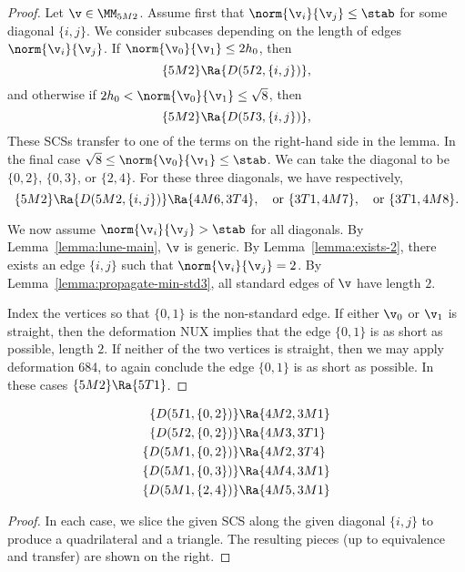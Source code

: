 \begin{proof}
Let $\v\in\MM_{5M2}$.  
Assume first that $\norm{\v_i}{\v_j}\le \stab$ for some diagonal $\{i,j\}$.
We consider subcases depending on the length of edges $\norm{\v_i}{\v_j}$.
If $\norm{\v_0}{\v_1}\le 2h_0$, then 
\[
\{5M2\}\Ra \{D(5I2,\{i,j\})\},
\]
and otherwise if  $2h_0 < \norm{\v_0}{\v_1} \le \sqrt8$, then
\[
\{5M2\}\Ra \{D(5I3,\{i,j\})\},
\]
These SCSs transfer to one of the terms on the right-hand side in the lemma.
In the final case $\sqrt8\le \norm{\v_0}{\v_1}\le \stab$.  We can take the diagonal to be $\{0,2\}$, $\{0,3\}$,
or $\{2,4\}$.  For these three diagonals, we have respectively,
\[
\{5M2\}\Ra \{D(5M2,\{i,j\})\}\Ra \{4M6,3T4\},\quad \text{or~} \{3T1,4M7\},\quad \text{or~} \{3T1,4M8\}.
\]

We now assume $\norm{\v_i}{\v_j}>\stab$ for all diagonals.
By Lemma~\ref{lemma:lune-main}, $\v$ is generic.
By Lemma~\ref{lemma:exists-2}, there exists an edge $\{i,j\}$ such that $\norm{\v_i}{\v_j} = 2$.
By Lemma~\ref{lemma:propagate-min-std3}, all standard edges of $\v$ have length $2$.

Index the vertices so that $\{0,1\}$ is the non-standard edge.  If either $\v_0$ or $\v_1$ is straight, then
the deformation NUX implies that the edge $\{0,1\}$ is as short as possible, length $2$.  
If neither of the two vertices is straight, then we may apply deformation 684, to again conclude the edge $\{0,1\}$
is as short as possible.
%
In these cases
$\{5M2\}\Ra\{5T1\}$.
\end{proof}

\begin{lemma}[]
\begin{align*}
\{D(5I1,\{0,2\})\}&\Ra \{4M2,3M1\}\\
\{D(5I2,\{0,2\})\}&\Ra \{4M3,3T1\}\\
\{D(5M1,\{0,2\})\}& \Ra \{4M2,3T4\}\\
\{D(5M1,\{0,3\})\}& \Ra \{4M4,3M1\}\\
\{D(5M1,\{2,4\})\}& \Ra \{4M5,3M1\}
\end{align*}
\end{lemma}

\begin{proof}
In each case, we slice the given SCS along the given diagonal $\{i,j\}$ to produce a quadrilateral and
a triangle.  The resulting pieces (up to equivalence and transfer) are shown on the right.
\end{proof}


